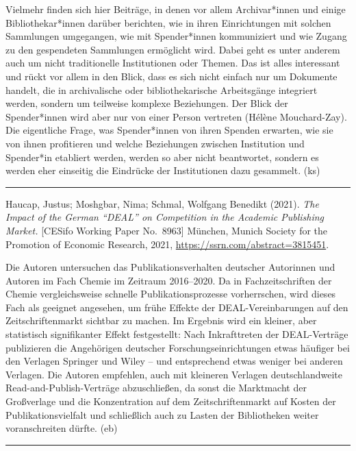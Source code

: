\documentclass[a4paper,
fontsize=11pt,
oneside,
numbers=noperiodatend,
parskip=half-,
bibliography=totoc,
final
]{scrartcl}
\begin{document}
Vielmehr finden sich hier Beiträge, in denen vor allem Archivar*innen
und einige Bibliothekar*innen darüber berichten, wie in ihren
Einrichtungen mit solchen Sammlungen umgegangen, wie mit Spender*innen
kommuniziert und wie Zugang zu den gespendeten Sammlungen ermöglicht
wird. Dabei geht es unter anderem auch um nicht traditionelle
Institutionen oder Themen. Das ist alles interessant und rückt vor allem
in den Blick, dass es sich nicht einfach nur um Dokumente handelt, die
in archivalische oder bibliothekarische Arbeitsgänge integriert werden,
sondern um teilweise komplexe Beziehungen. Der Blick der Spender*innen
wird aber nur von einer Person vertreten (Hélène Mouchard-Zay). Die
eigentliche Frage, was Spender*innen von ihren Spenden erwarten, wie sie
von ihnen profitieren und welche Beziehungen zwischen Institution und
Spender*in etabliert werden, werden so aber nicht beantwortet, sondern
es werden eher einseitig die Eindrücke der Institutionen dazu gesammelt.
(ks)

\begin{center}\rule{0.5\linewidth}{0.5pt}\end{center}

Haucap, Justus; Moshgbar, Nima; Schmal, Wolfgang Benedikt (2021).
\emph{The Impact of the German \enquote{DEAL} on Competition in the
Academic Publishing Market.} {[}CESifo Working Paper No.~8963{]}
München, Munich Society for the Promotion of Economic Research, 2021,
\url{https://ssrn.com/abstract=3815451}.

Die Autoren untersuchen das Publikationsverhalten deutscher Autorinnen
und Autoren im Fach Chemie im Zeitraum 2016--2020. Da in
Fachzeitschriften der Chemie vergleichsweise schnelle
Publikationsprozesse vorherrschen, wird dieses Fach als geeignet
angesehen, um frühe Effekte der DEAL-Vereinbarungen auf den
Zeitschriftenmarkt sichtbar zu machen. Im Ergebnis wird ein kleiner,
aber statistisch signifikanter Effekt festgestellt: Nach Inkrafttreten
der DEAL-Verträge publizieren die Angehörigen deutscher
Forschungseinrichtungen etwas häufiger bei den Verlagen Springer und
Wiley -- und entsprechend etwas weniger bei anderen Verlagen. Die
Autoren empfehlen, auch mit kleineren Verlagen deutschlandweite
Read-and-Publish-Verträge abzuschließen, da sonst die Marktmacht der
Großverlage und die Konzentration auf dem Zeitschriftenmarkt auf Kosten
der Publikationsvielfalt und schließlich auch zu Lasten der Bibliotheken
weiter voranschreiten dürfte. (eb)

\begin{center}\rule{0.5\linewidth}{0.5pt}\end{center}
\end{document}

